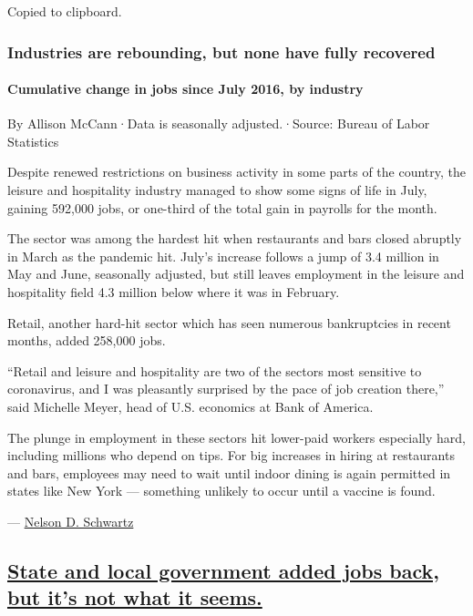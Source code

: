 Copied to clipboard.

\hypertarget{industries-are-rebounding-but-none-have-fully-recovered}{%
\subsubsection{Industries are rebounding, but none have fully
recovered}\label{industries-are-rebounding-but-none-have-fully-recovered}}

\hypertarget{cumulative-change-in-jobs-since-july-2016-by-industry}{%
\paragraph{Cumulative change in jobs since July 2016, by
industry}\label{cumulative-change-in-jobs-since-july-2016-by-industry}}

By Allison McCann·Data is seasonally adjusted.·Source: Bureau of Labor
Statistics

Despite renewed restrictions on business activity in some parts of the
country, the leisure and hospitality industry managed to show some signs
of life in July, gaining 592,000 jobs, or one-third of the total gain in
payrolls for the month.

The sector was among the hardest hit when restaurants and bars closed
abruptly in March as the pandemic hit. July's increase follows a jump of
3.4 million in May and June, seasonally adjusted, but still leaves
employment in the leisure and hospitality field 4.3 million below where
it was in February.

Retail, another hard-hit sector which has seen numerous bankruptcies in
recent months, added 258,000 jobs.

``Retail and leisure and hospitality are two of the sectors most
sensitive to coronavirus, and I was pleasantly surprised by the pace of
job creation there,'' said Michelle Meyer, head of U.S. economics at
Bank of America.

The plunge in employment in these sectors hit lower-paid workers
especially hard, including millions who depend on tips. For big
increases in hiring at restaurants and bars, employees may need to wait
until indoor dining is again permitted in states like New York ---
something unlikely to occur until a vaccine is found.

---
\href{https://www.nytimes3xbfgragh.onion/by/nelson-d-schwartz}{Nelson D.
Schwartz}

\hypertarget{state-and-local-government-added-jobs-back-but-its-not-what-it-seems}{%
\subsection{\texorpdfstring{\protect\hyperlink{state-and-local-government-added-jobs-back-but-its-not-what-it-seems}{State
and local government added jobs back, but it's not what it
seems.}}{State and local government added jobs back, but it's not what it seems.}}\label{state-and-local-government-added-jobs-back-but-its-not-what-it-seems}}

